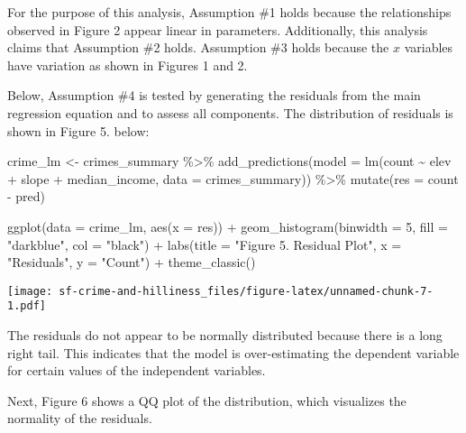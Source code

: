 \documentclass[
]{article}
\newenvironment{Shaded}{\begin{snugshade}}{\end{snugshade}}
\newcommand{\AttributeTok}[1]{\textcolor[rgb]{0.77,0.63,0.00}{#1}}
\newcommand{\DecValTok}[1]{\textcolor[rgb]{0.00,0.00,0.81}{#1}}
\newcommand{\FunctionTok}[1]{\textcolor[rgb]{0.00,0.00,0.00}{#1}}
\newcommand{\NormalTok}[1]{#1}
\newcommand{\OtherTok}[1]{\textcolor[rgb]{0.56,0.35,0.01}{#1}}
\newcommand{\SpecialCharTok}[1]{\textcolor[rgb]{0.00,0.00,0.00}{#1}}
\newcommand{\StringTok}[1]{\textcolor[rgb]{0.31,0.60,0.02}{#1}}
\begin{document}
For the purpose of this analysis, Assumption \#1 holds because the
relationships observed in Figure 2 appear linear in parameters.
Additionally, this analysis claims that Assumption \#2 holds. Assumption
\#3 holds because the \(x\) variables have variation as shown in Figures
1 and 2.

Below, Assumption \#4 is tested by generating the residuals from the
main regression equation and to assess all components. The distribution
of residuals is shown in Figure 5. below:

\begin{Shaded}
\begin{Highlighting}[]
\NormalTok{crime\_lm }\OtherTok{\textless{}{-}}\NormalTok{ crimes\_summary }\SpecialCharTok{\%\textgreater{}\%} 
  \FunctionTok{add\_predictions}\NormalTok{(}\AttributeTok{model =} \FunctionTok{lm}\NormalTok{(count }\SpecialCharTok{\textasciitilde{}}\NormalTok{ elev }\SpecialCharTok{+}\NormalTok{ slope }\SpecialCharTok{+}\NormalTok{ median\_income, }\AttributeTok{data =}\NormalTok{ crimes\_summary)) }\SpecialCharTok{\%\textgreater{}\%} 
  \FunctionTok{mutate}\NormalTok{(}\AttributeTok{res =}\NormalTok{ count }\SpecialCharTok{{-}}\NormalTok{ pred)}

\FunctionTok{ggplot}\NormalTok{(}\AttributeTok{data =}\NormalTok{ crime\_lm, }\FunctionTok{aes}\NormalTok{(}\AttributeTok{x =}\NormalTok{ res)) }\SpecialCharTok{+}
  \FunctionTok{geom\_histogram}\NormalTok{(}\AttributeTok{binwidth =} \DecValTok{5}\NormalTok{, }\AttributeTok{fill =} \StringTok{"darkblue"}\NormalTok{, }\AttributeTok{col =} \StringTok{"black"}\NormalTok{) }\SpecialCharTok{+} 
  \FunctionTok{labs}\NormalTok{(}\AttributeTok{title =} \StringTok{"Figure 5. Residual Plot"}\NormalTok{,}
       \AttributeTok{x =} \StringTok{"Residuals"}\NormalTok{,}
       \AttributeTok{y =} \StringTok{"Count"}\NormalTok{) }\SpecialCharTok{+}
  \FunctionTok{theme\_classic}\NormalTok{()}
\end{Highlighting}
\end{Shaded}

\texttt{[image: sf-crime-and-hilliness\_files/figure-latex/unnamed-chunk-7-1.pdf]}

The residuals do not appear to be normally distributed because there is
a long right tail. This indicates that the model is over-estimating the
dependent variable for certain values of the independent variables.

Next, Figure 6 shows a QQ plot of the distribution, which visualizes the
normality of the residuals.
\end{document}
